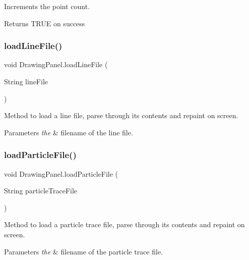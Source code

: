 Increments the point count. 

\begin{DoxyReturn}{Returns}
T\+R\+UE on success 
\end{DoxyReturn}
\mbox{\label{class_drawing_panel_a72ba678075cd06d0455dddfe2509da83}} 
\subsubsection{\texorpdfstring{load\+Line\+File()}{loadLineFile()}}
{\footnotesize\ttfamily void Drawing\+Panel.\+load\+Line\+File (\begin{DoxyParamCaption}\item[{String}]{line\+File }\end{DoxyParamCaption})}



Method to load a line file, parse through its contents and repaint on screen. 


\begin{DoxyParams}{Parameters}
{\em the} & filename of the line file. \\
\hline
\end{DoxyParams}
\mbox{\label{class_drawing_panel_a2c3c19d065415dfffacfb2ded1fb114a}} 
\subsubsection{\texorpdfstring{load\+Particle\+File()}{loadParticleFile()}}
{\footnotesize\ttfamily void Drawing\+Panel.\+load\+Particle\+File (\begin{DoxyParamCaption}\item[{String}]{particle\+Trace\+File }\end{DoxyParamCaption})}



Method to load a particle trace file, parse through its contents and repaint on screen. 


\begin{DoxyParams}{Parameters}
{\em the} & filename of the particle trace file. \\
\hline
\end{DoxyParams}
\mbox{\label{class_drawing_panel_a94f31c4cf6856ae742da17f00d8b33e4}} 
